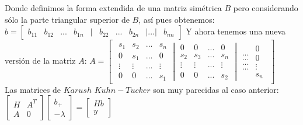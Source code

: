 \documentclass[12pt]{article}
\begin{document}
Donde definimos la forma extendida de una matriz sim\'etrica $B$ pero considerando s\'olo la parte triangular superior de $B$, as\'i pues obtenemos:
\newline
$b =
\begin{bmatrix}
b_{11} & b_{12} & ... & b_{1n} & | & b_{22} & ... & b_{2n} & | ... | & b_{nn}
\end{bmatrix}$
\newline
\newline
Y ahora tenemos una nueva versi\'on de la matriz $A$:
\newline
\newline
$A=
\begin{bmatrix}
\begin{matrix}
s_{1} & s_{2} & ... & s_{n} \\
0 & s_{1} & ... & 0 \\
\vdots & \vdots & ... & \vdots \\
0 & 0 & ... & s_{1}
\end{matrix}
\begin{vmatrix}
0 & 0 & ... & 0 \\
s_{2} & s_{3} & ... & s_{n} \\
\vdots & \vdots & ... & \vdots \\
0 & 0 & ... & s_{2}
\end{vmatrix}
\begin{matrix}
... \\
... \\
... \\
...
\end{matrix}
\begin{matrix}
0 \\
0 \\
\vdots \\
s_{n}
\end{matrix}
\end{bmatrix}$
\\
Las matrices de $Karush$ $Kuhn-Tucker$ son muy parecidas al caso anterior:
\newline
$\begin{bmatrix}
H & A^{T} \\
A & 0
\end{bmatrix}
\begin{bmatrix}
b_{+} \\
- \lambda
\end{bmatrix} =
\begin{bmatrix}
Hb \\
y
\end{bmatrix}$
\end{document}
